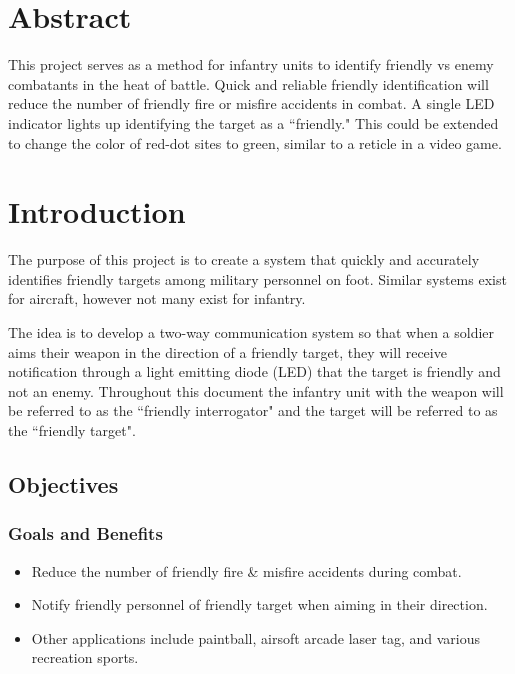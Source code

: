 \documentclass[letterpaper,10pt]{article}
\newcommand{\buildtoc}{
	\clearpage
	\singlespacing
	\tableofcontents
	\onehalfspacing
}
\begin{document}
\maketitle
\pagestyle{fancy}
\begin{spacing}{1.15}


\color{black}
\section*{Abstract}
This project serves as a method for infantry units to identify friendly vs enemy combatants in the heat of battle. Quick and reliable friendly identification will reduce the number of friendly fire or misfire accidents in combat. A single LED indicator lights up identifying the target as a ``friendly." This could be extended to change the color of red-dot sites to green, similar to a reticle in a video game. 
\buildtoc
{}
\clearpage
\setcounter{page}{1}

\section{Introduction}
The purpose of this project is to create a system that quickly and accurately identifies friendly targets among military personnel on foot. Similar systems exist for aircraft, however not many exist for infantry.

The idea is to develop a two-way communication system so that when a soldier aims their weapon in the direction of a friendly target, they will receive notification through a light emitting diode (LED) that the target is friendly and not an enemy. Throughout this document the infantry unit with the weapon will be referred to as the ``friendly interrogator" and the target will  be referred to as the ``friendly target". 

\subsection{Objectives}
\subsubsection{Goals and Benefits}
\begin{itemize}
	\item Reduce the number of friendly fire \& misfire accidents during combat.
	\item Notify friendly personnel of friendly target when aiming in their direction.
	\item Other applications include paintball, airsoft arcade laser tag, and various recreation sports.
\end{itemize}



\end{spacing}
\end{document}
